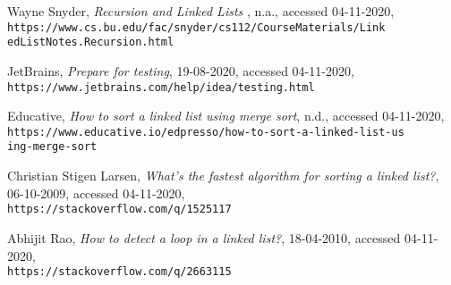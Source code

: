 \documentclass{article}
\begin{document}
\begin{thebibliography}{10}
Wayne Snyder, \textit{Recursion and Linked Lists
}, n.a., accessed 04-11-2020, \\\texttt{https://www.cs.bu.edu/fac/snyder/cs112/CourseMaterials/Link\\edListNotes.Recursion.html}

JetBrains, \textit{Prepare for testing}, 19-08-2020, accessed 04-11-2020, \\\texttt{https://www.jetbrains.com/help/idea/testing.html}

Educative, \textit{How to sort a linked list using merge sort}, n.d., accessed 04-11-2020, \\\texttt{https://www.educative.io/edpresso/how-to-sort-a-linked-list-us\\ing-merge-sort}

Christian Stigen Larsen, \textit{What's the fastest algorithm for sorting a linked list?}, 06-10-2009, accessed 04-11-2020, \\\texttt{https://stackoverflow.com/q/1525117}

Abhijit Rao, \textit{How to detect a loop in a linked list?}, 18-04-2010, accessed 04-11-2020, \\\texttt{https://stackoverflow.com/q/2663115}

\end{thebibliography}
\end{document}
